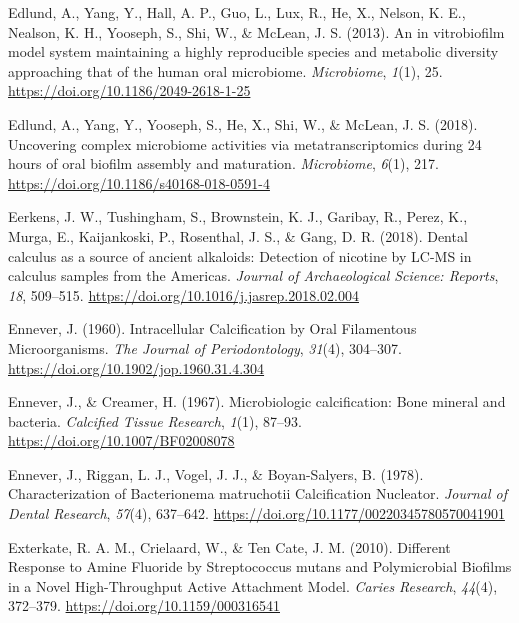 \documentclass[
  letterpaper,
]{book}
\newlength{\cslhangindent}
\newlength{\cslentryspacingunit} %
\newenvironment{CSLReferences}[2] %
 {%
  \setlength{\parindent}{0pt}
  \ifodd #1
  \let\oldpar\par
  \def\par{\hangindent=\cslhangindent\oldpar}
  \fi
  \setlength{\parskip}{#2\cslentryspacingunit}
 }%
 {}
\begin{document}
\begin{CSLReferences}{1}{0}
\leavevmode{}%
Edlund, A., Yang, Y., Hall, A. P., Guo, L., Lux, R., He, X., Nelson, K.
E., Nealson, K. H., Yooseph, S., Shi, W., \& McLean, J. S. (2013). An in
vitrobiofilm model system maintaining a highly reproducible species and
metabolic diversity approaching that of the human oral microbiome.
\emph{Microbiome}, \emph{1}(1), 25.
\url{https://doi.org/10.1186/2049-2618-1-25}

\leavevmode{}%
Edlund, A., Yang, Y., Yooseph, S., He, X., Shi, W., \& McLean, J. S.
(2018). Uncovering complex microbiome activities via metatranscriptomics
during 24 hours of oral biofilm assembly and maturation.
\emph{Microbiome}, \emph{6}(1), 217.
\url{https://doi.org/10.1186/s40168-018-0591-4}

\leavevmode{}%
Eerkens, J. W., Tushingham, S., Brownstein, K. J., Garibay, R., Perez,
K., Murga, E., Kaijankoski, P., Rosenthal, J. S., \& Gang, D. R. (2018).
Dental calculus as a source of ancient alkaloids: {Detection} of
nicotine by {LC-MS} in calculus samples from the {Americas}.
\emph{Journal of Archaeological Science: Reports}, \emph{18}, 509--515.
\url{https://doi.org/10.1016/j.jasrep.2018.02.004}

\leavevmode{}%
Ennever, J. (1960). Intracellular {Calcification} by {Oral Filamentous
Microorganisms}. \emph{The Journal of Periodontology}, \emph{31}(4),
304--307. \url{https://doi.org/10.1902/jop.1960.31.4.304}

\leavevmode{}%
Ennever, J., \& Creamer, H. (1967). Microbiologic calcification: {Bone}
mineral and bacteria. \emph{Calcified Tissue Research}, \emph{1}(1),
87--93. \url{https://doi.org/10.1007/BF02008078}

\leavevmode{}%
Ennever, J., Riggan, L. J., Vogel, J. J., \& Boyan-Salyers, B. (1978).
Characterization of {Bacterionema} matruchotii {Calcification
Nucleator}. \emph{Journal of Dental Research}, \emph{57}(4), 637--642.
\url{https://doi.org/10.1177/00220345780570041901}

\leavevmode{}%
Exterkate, R. A. M., Crielaard, W., \& Ten Cate, J. M. (2010). Different
{Response} to {Amine Fluoride} by {Streptococcus} mutans and
{Polymicrobial Biofilms} in a {Novel High-Throughput Active Attachment
Model}. \emph{Caries Research}, \emph{44}(4), 372--379.
\url{https://doi.org/10.1159/000316541}


\end{CSLReferences}
\end{document}
